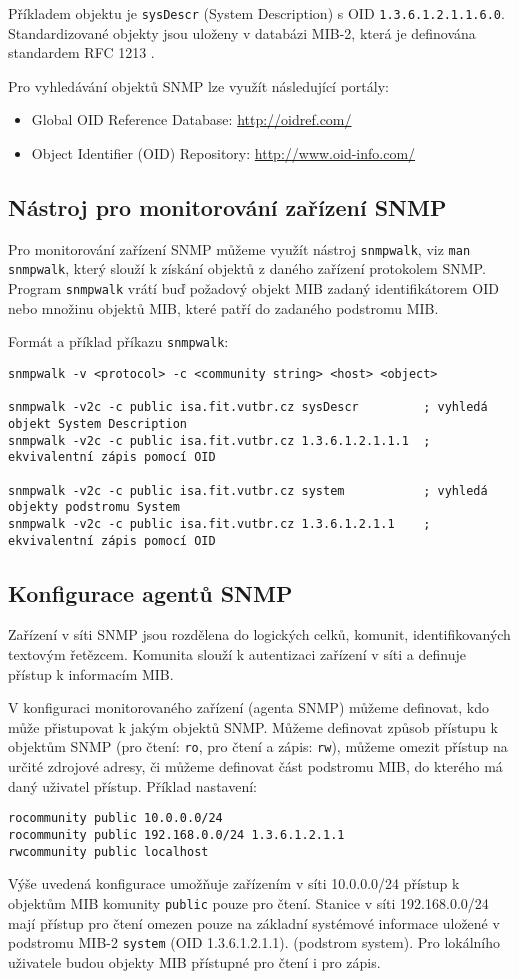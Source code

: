 Příkladem objektu je {\tt sysDescr} (System Description) s OID {\tt 1.3.6.1.2.1.1.6.0}. Standardizované objekty jsou uloženy v databázi MIB-2, která je definována standardem RFC 1213 \cite{rfc1213}.

Pro vyhledávání objektů SNMP lze využít následující portály:
\begin{itemize}
  \item Global OID Reference Database: \url{http://oidref.com/}
  \item Object Identifier (OID) Repository: \url{http://www.oid-info.com/}
\end{itemize}

\subsection{Nástroj pro monitorování zařízení SNMP}
Pro monitorování zařízení SNMP můžeme využít nástroj {\tt snmpwalk}, viz {\tt man snmpwalk}, který slouží k získání objektů z daného zařízení protokolem SNMP. Program {\tt snmpwalk} vrátí buď požadový objekt MIB zadaný identifikátorem OID nebo množinu objektů MIB, které patří do zadaného podstromu MIB.

Formát a příklad příkazu {\tt snmpwalk}:
{\small
\begin{verbatim}
snmpwalk -v <protocol> -c <community string> <host> <object>

snmpwalk -v2c -c public isa.fit.vutbr.cz sysDescr         ; vyhledá objekt System Description
snmpwalk -v2c -c public isa.fit.vutbr.cz 1.3.6.1.2.1.1.1  ; ekvivalentní zápis pomocí OID

snmpwalk -v2c -c public isa.fit.vutbr.cz system           ; vyhledá objekty podstromu System
snmpwalk -v2c -c public isa.fit.vutbr.cz 1.3.6.1.2.1.1    ; ekvivalentní zápis pomocí OID
\end{verbatim}
}

\subsection{Konfigurace agentů SNMP}
Zařízení v síti SNMP jsou rozdělena do logických celků, komunit, identifikovaných textovým  řetězcem. Komunita slouží k autentizaci zařízení v síti a definuje přístup k informacím MIB.

V konfiguraci monitorovaného zařízení (agenta SNMP) můžeme definovat, kdo může přistupovat k jakým objektů SNMP. Můžeme definovat způsob přístupu k objektům SNMP (pro čtení: {\tt ro},  pro čtení a zápis: {\tt rw}), můžeme omezit přístup na určité zdrojové adresy, či můžeme definovat část podstromu MIB, do kterého má daný uživatel přístup.  
Příklad nastavení: 
\begin{verbatim}
rocommunity public 10.0.0.0/24
rocommunity public 192.168.0.0/24 1.3.6.1.2.1.1
rwcommunity public localhost
\end{verbatim}
Výše uvedená konfigurace umožňuje zařízením v síti 10.0.0.0/24 přístup k objektům MIB komunity {\tt public} pouze
 pro čtení. Stanice v síti 192.168.0.0/24 mají přístup pro čtení omezen pouze na základní systémové informace uložené v podstromu MIB-2 {\tt system} (OID 1.3.6.1.2.1.1). 
 (podstrom system). Pro lokálního uživatele budou objekty MIB přístupné pro čtení i pro zápis.

